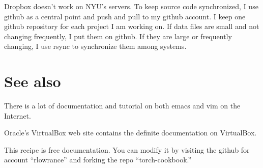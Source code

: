\documentclass{article}
\begin{document}
Dropbox doesn't work on NYU's servers. To keep source code synchronized,
I use github as a central point and push and pull to my github account.
I keep one github repository for each project I am working on. If data
files are small and not changing frequently, I put them on github. If
they are large or frequently changing, I use rsync to synchronize them
among systems.

\section{See also}

There is a lot of documentation and tutorial on both emacs and vim on
the Internet.

Oracle's VirtualBox web site contains the definite documentation on
VirtualBox.

This recipe is free documentation. You can modify it by visiting the
github for account ``rlowrance'' and forking the repo
``torch-cookbook.''
\end{document}
